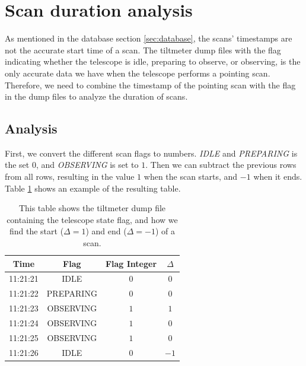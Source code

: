 
\section{Scan duration analysis}\label{sec:scan_duration_analysis}
As mentioned in the database section \ref{sec:database}, the scans' timestamps are not the accurate start time of a scan.
The tiltmeter dump files with the flag indicating whether the telescope is idle, preparing to observe, or observing,
is the only accurate data we have when the telescope performs a pointing scan.
Therefore, we need to combine the timestamp of the pointing scan with the flag in the dump files to analyze the duration of scans.

\subsection{Analysis}
First, we convert the different scan flags to numbers.
\textit{IDLE} and \textit{PREPARING} is the set $0$, and \textit{OBSERVING} is set to $1$.
Then we can subtract the previous rows from all rows, resulting in the value $1$ when the scan starts, and $-1$ when it ends.
Table \ref{tab:scan_flag_difference} shows an example of the resulting table.


\begin{table}[H]
    \centering
    \begin{tabular}{cccc}
        \toprule
        Time & Flag & Flag Integer & $\Delta$ \\
        \midrule
        11:21:21 & IDLE & $0$ & $0$ \\
        11:21:22 & PREPARING & $0$ & $0$ \\
        11:21:23 & OBSERVING & $1$ & $1$ \\
        11:21:24 & OBSERVING & $1$ & $0$ \\
        11:21:25 & OBSERVING & $1$ & $0$ \\
        11:21:26 & IDLE & $0$ & $-1$ \\
        \bottomrule
    \end{tabular}
    \caption{This table shows the tiltmeter dump file containing the telescope state flag,
            and how we find the start ($\Delta = 1$) and end ($\Delta = -1$) of a scan.}
    \label{tab:scan_flag_difference}
\end{table}


